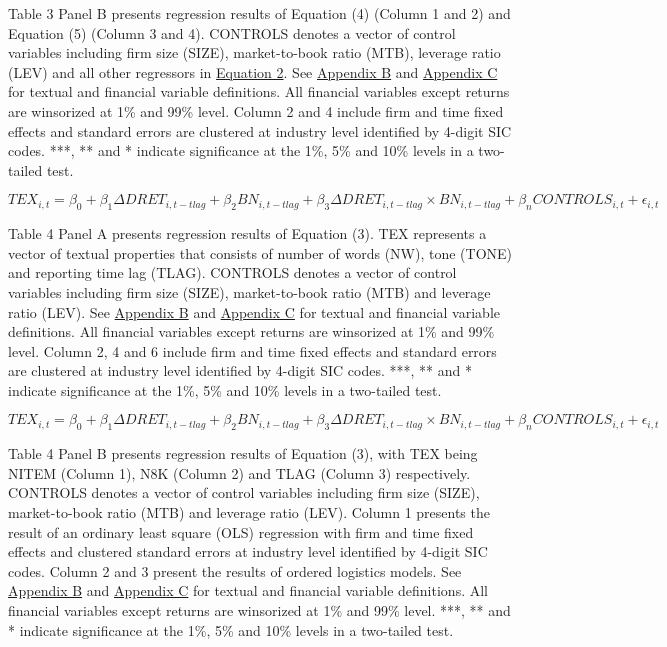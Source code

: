 Table 3 Panel B presents regression results of Equation (4) (Column 1 and 2) and Equation (5) (Column 3 and 4). CONTROLS denotes a vector of control variables including firm size (SIZE), market-to-book ratio (MTB), leverage ratio (LEV) and all other regressors in \hyperref[eq2]{Equation 2}. See \hyperref[appb]{Appendix B} and \hyperref[appc]{Appendix C} for textual and financial variable definitions. All financial variables except returns are winsorized at 1\% and 99\% level. Column 2 and 4 include firm and time fixed effects and standard errors are clustered at industry level identified by 4-digit SIC codes. ***, ** and * indicate significance at the 1\%, 5\% and 10\% levels in a two-tailed test.

\newpage

\setcounter{equation}{2}
\begin{equation}
TEX_{i,t}=\beta_0+\beta_1\Delta DRET_{i,t-tlag}+\beta_2BN_{i,t-tlag}+\beta_3\Delta DRET_{i,t-tlag}\times BN_{i,t-tlag}+\beta_nCONTROLS_{i,t}+\epsilon_{i,t}
\end{equation}

Table 4 Panel A presents regression results of Equation (3). TEX represents a vector of textual properties that consists of number of words (NW), tone (TONE) and reporting time lag (TLAG). CONTROLS denotes a vector of control variables including firm size (SIZE), market-to-book ratio (MTB) and leverage ratio (LEV). See \hyperref[appb]{Appendix B} and \hyperref[appc]{Appendix C} for textual and financial variable definitions. All financial variables except returns are winsorized at 1\% and 99\% level. Column 2, 4 and 6 include firm and time fixed effects and standard errors are clustered at industry level identified by 4-digit SIC codes. ***, ** and * indicate significance at the 1\%, 5\% and 10\% levels in a two-tailed test.

\newpage

\setcounter{equation}{2}
\begin{equation}
TEX_{i,t}=\beta_0+\beta_1\Delta DRET_{i,t-tlag}+\beta_2BN_{i,t-tlag}+\beta_3\Delta DRET_{i,t-tlag}\times BN_{i,t-tlag}+\beta_nCONTROLS_{i,t}+\epsilon_{i,t}
\end{equation}

Table 4 Panel B presents regression results of Equation (3), with TEX being NITEM (Column 1), N8K (Column 2) and TLAG (Column 3) respectively. CONTROLS denotes a vector of control variables including firm size (SIZE), market-to-book ratio (MTB) and leverage ratio (LEV). Column 1 presents the result of an ordinary least square (OLS) regression with firm and time fixed effects and clustered standard errors at industry level identified by 4-digit SIC codes. Column 2 and 3 present the results of ordered logistics models. See \hyperref[appb]{Appendix B} and \hyperref[appc]{Appendix C} for textual and financial variable definitions. All financial variables except returns are winsorized at 1\% and 99\% level. ***, ** and * indicate significance at the 1\%, 5\% and 10\% levels in a two-tailed test.